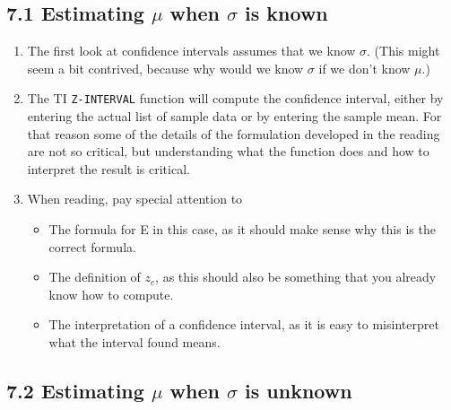\documentclass{ccg-topic}
\begin{document}
\subsection*{7.1 Estimating $\mu$ when $\sigma$ is known}

\begin{enumerate}

    \item The first look at confidence intervals assumes that we know $\sigma$.  (This might seem a bit contrived, because why would we know $\sigma$ if we don’t know $\mu$.)
    
    \item The TI \texttt{Z-INTERVAL} function will compute the confidence interval, either by entering the actual list of sample data or by entering the sample mean. For that reason some of the details of the formulation developed in the reading are not so critical, but understanding what the function does and how to interpret the result is critical.
    
    \item When reading, pay special attention to
    
        \begin{itemize}
        
            \item The formula for E in this case, as it should make sense why this is the correct formula.
            
            \item The definition of $z_c$, as this should also be something that you already know how to compute.
            
            \item The interpretation of a confidence interval, as it is easy to misinterpret what the interval found means.
            
        \end{itemize}
        
\end{enumerate}

\subsection*{7.2 Estimating $\mu$ when $\sigma$ is unknown}
\end{document}
